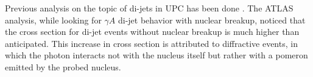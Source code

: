 Previous analysis on the topic of di-jets in UPC has been done \cite{collaboration_measurement_2025}. The ATLAS analysis, while looking for $\gamma A$ di-jet behavior with nuclear breakup, noticed that the cross section for di-jet events without nuclear breakup is much higher than anticipated. This increase in cross section is attributed to diffractive events, in which the photon interacts not with the nucleus itself but rather with a pomeron emitted by the probed nucleus.
